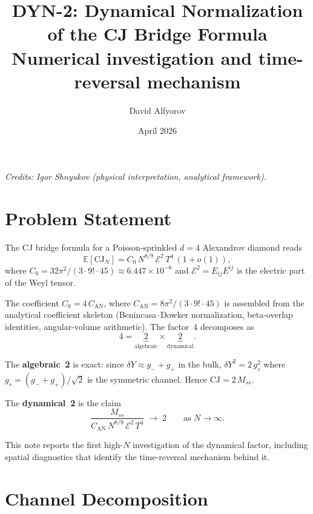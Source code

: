\documentclass[11pt,a4paper]{article}
\title{DYN-2: Dynamical Normalization of the CJ Bridge Formula\\[6pt]
\large Numerical investigation and time-reversal mechanism}
\author{David Alfyorov}
\date{April 2026}
\begin{document}
\maketitle
\tableofcontents

\vspace{1em}
\noindent\textit{Credits: Igor Shnyukov (physical interpretation, analytical framework).}

\section{Problem Statement}

The CJ bridge formula for a Poisson-sprinkled $d{=}4$ Alexandrov diamond reads
\begin{equation}\label{eq:bridge}
  \mathbb{E}[\mathrm{CJ}_N] = C_0\, N^{8/9}\, \mathcal{E}^2\, T^4 \,(1 + o(1)),
\end{equation}
where $C_0 = 32\pi^2/(3 \cdot 9! \cdot 45) \approx 6.447 \times 10^{-6}$
and $\mathcal{E}^2 = E_{ij}E^{ij}$ is the electric part of the Weyl tensor.

The coefficient $C_0 = 4\,C_\mathrm{AN}$, where $C_\mathrm{AN} = 8\pi^2/(3 \cdot 9! \cdot 45)$
is assembled from the analytical coefficient skeleton (Benincasa--Dowker normalization,
beta-overlap identities, angular-volume arithmetic).
The factor~4 decomposes as
\begin{equation}\label{eq:factor4}
  4 = \underbrace{2}_{\text{algebraic}} \times \underbrace{2}_{\text{dynamical}}.
\end{equation}

The \textbf{algebraic~2} is exact: since $\delta Y \approx g_- + g_+$ in the bulk,
$\delta Y^2 = 2\,g_s^2$ where $g_s = (g_- + g_+)/\sqrt{2}$ is the symmetric channel.
Hence $\mathrm{CJ} = 2\,M_{ss}$.

The \textbf{dynamical~2} is the claim
\begin{equation}\label{eq:dyn2}
  \frac{M_{ss}}{C_\mathrm{AN}\, N^{8/9}\, \mathcal{E}^2\, T^4} \;\longrightarrow\; 2
  \qquad\text{as } N \to \infty.
\end{equation}

This note reports the first high-$N$ investigation of the dynamical factor,
including spatial diagnostics that identify the time-reversal mechanism behind it.

\section{Channel Decomposition}
\end{document}
